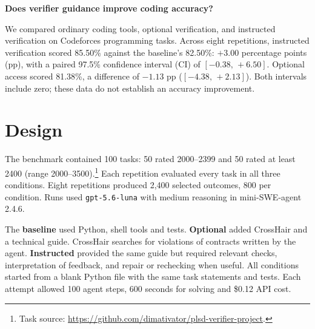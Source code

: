 \documentclass[10pt,a4paper]{article}
\begin{document}
\begin{center}
{\Large\bfseries Does verifier guidance improve coding accuracy?}
\end{center}
\vspace{-2mm}

We compared ordinary coding tools, optional verification, and instructed verification on Codeforces programming tasks. Across eight repetitions, instructed verification scored 85.50\% against the baseline's 82.50\%: $+3.00$ percentage points (pp), with a paired 97.5\% confidence interval (CI) of $[-0.38,\,+6.50]$. Optional access scored 81.38\%, a difference of $-1.13$ pp ($[-4.38,\,+2.13]$). Both intervals include zero; these data do not establish an accuracy improvement.

\section*{Design}
The benchmark contained 100 tasks: 50 rated 2000--2399 and 50 rated at least 2400 (range 2000--3500).\footnote{Task source: \url{https://github.com/dimativator/plsd-verifier-project}.} Each repetition evaluated every task in all three conditions. Eight repetitions produced 2,400 selected outcomes, 800 per condition. Runs used \texttt{gpt-5.6-luna} with medium reasoning in mini-SWE-agent 2.4.6.

The \textbf{baseline} used Python, shell tools and tests. \textbf{Optional} added CrossHair and a technical guide. CrossHair searches for violations of contracts written by the agent. \textbf{Instructed} provided the same guide but required relevant checks, interpretation of feedback, and repair or rechecking when useful. All conditions started from a blank Python file with the same task statements and tests. Each attempt allowed 100 agent steps, 600 seconds for solving and \$0.12 API cost.
\end{document}
